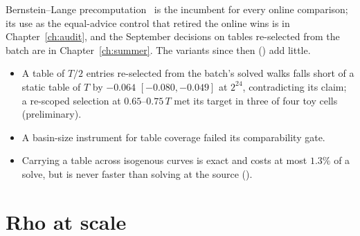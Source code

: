 Bernstein--Lange precomputation~\cite{bl2012} is the incumbent for every
online comparison; its use as the equal-advice control that retired the
online wins is in Chapter~\ref{ch:audit}, and the September decisions on
tables re-selected from the batch are in Chapter~\ref{ch:summer}. The
variants since then
()
add little.
\begin{itemize}
\item A table of $T/2$ entries re-selected from the batch's solved walks
  falls short of a static table of $T$ by $-0.064$ $[-0.080,-0.049]$ at
  $2^{24}$, contradicting its claim; a re-scoped selection at $0.65$--$0.75\,T$
  met its target in three of four toy cells (preliminary).
\item A basin-size instrument for table coverage failed its comparability
  gate.
\item Carrying a table across isogenous curves is exact and costs at most
  $1.3\%$ of a solve, but is never faster than solving at the source
  ().
\end{itemize}

\section{Rho at scale}\label{sec:rv-scale}

